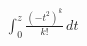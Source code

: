 \documentclass[preview]{standalone}
\begin{document}
\begin{align*}
\int_0^z { { \frac{(-t^2)^k}{k!} } } \, dt
\end{align*}
\end{document}

